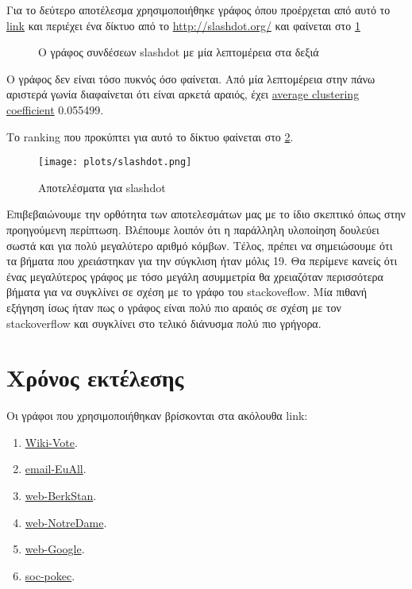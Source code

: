 Για το δεύτερο αποτέλεσμα χρησιμοποιήθηκε γράφος όπου προέρχεται από αυτό το
\href{http://snap.stanford.edu/data/soc-Slashdot0811.html}{link} 
και περιέχει ένα δίκτυο από το
\href{http://slashdot.org/}{http://slashdot.org/}
και φαίνεται στο
\hyperref[fig:slashGraph]{\figurename{} \ref{fig:slashGraph}}
\begin{figure}[h!]
	\centering
	\caption{O γράφος συνδέσεων slashdot με μία λεπτομέρεια στα δεξιά}
	\label{fig:slashGraph}
\end{figure}

Ο γράφος δεν είναι τόσο πυκνός όσο φαίνεται.
Από μία λεπτομέρεια στην πάνω αριστερά γωνία διαφαίνεται ότι είναι αρκετά αραιός,
έχει
\href{https://en.wikipedia.org/wiki/Clustering_coefficient#Global_clustering_coefficient}{average clustering coefficient} 0.055499.

Το ranking που προκύπτει για αυτό το δίκτυο φαίνεται στο
\hyperref[fig:slackres]{\figurename{} \ref{fig:slackres}}.
\begin{figure}[h!t]
	\centering
	\texttt{[image: plots/slashdot.png]}
	\caption{Αποτελέσματα για slashdot}
	\label{fig:slackres}
\end{figure}
Επιβεβαιώνουμε την ορθότητα των αποτελεσμάτων μας με το ίδιο σκεπτικό όπως στην προηγούμενη περίπτωση.
Βλέπουμε λοιπόν ότι η παράλληλη υλοποίηση δουλεύει σωστά και για πολύ μεγαλύτερο αριθμό κόμβων.
Τέλος, πρέπει να σημειώσουμε ότι τα βήματα που χρειάστηκαν για την σύγκλιση ήταν μόλις 19.
Θα περίμενε κανείς ότι ένας μεγαλύτερος γράφος με τόσο μεγάλη ασυμμετρία θα χρειαζόταν περισσότερα βήματα για να συγκλίνει σε σχέση με το γράφο του stackoveflow.
Μία πιθανή  εξήγηση ίσως ήταν πως ο γράφος είναι  πολύ πιο αραιός σε σχέση με τον stackoverflow και συγκλίνει  στο τελικό διάνυσμα πολύ πιο γρήγορα.
\clearpage
\section{Χρόνος εκτέλεσης}
Οι γράφοι που χρησιμοποιήθηκαν βρίσκονται στα ακόλουθα link:
\begin{enumerate} 
	\item \href{https://snap.stanford.edu/data/wiki-Vote.html}{Wiki-Vote}.
	\item \href{https://snap.stanford.edu/data/email-EuAll.html}{email-EuAll}.
	\item \href{https://snap.stanford.edu/data/web-BerkStan.html}{web-BerkStan}.
	\item \href{https://snap.stanford.edu/data/web-NotreDame.html}{web-NotreDame}.
	\item \href{https://snap.stanford.edu/data/web-Google.html}{web-Google}.
	\item \href{https://snap.stanford.edu/data/soc-pokec.html}{soc-pokec}.
\end{enumerate}

